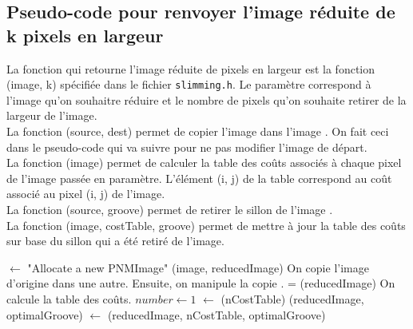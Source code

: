 \documentclass[a4paper, 11pt, oneside]{article}
\begin{document}
\subsection{Pseudo-code pour renvoyer l'image réduite de k pixels en largeur}
La fonction qui retourne l'image réduite de  pixels en largeur est la fonction (image, k) spécifiée dans le fichier \texttt{slimming.h}. Le paramètre  correspond à l'image qu'on souhaitre réduire et  le nombre de pixels qu'on souhaite retirer de la largeur de l'image.\\
La fonction (source, dest) permet de copier l'image  dans l'image . On fait ceci dans le pseudo-code qui va suivre pour ne pas modifier l'image de départ.\\
La fonction (image) permet de calculer la table des coûts associés à chaque pixel de l'image passée en paramètre. L'élément (i, j) de la table correspond au coût associé au pixel (i, j) de l'image.\\
La fonction (source, groove) permet de retirer le sillon  de l'image .\\
La fonction (image, costTable, groove) permet de mettre à jour la table des coûts  sur base du sillon  qui a été retiré de l'image.

\begin{codebox} %
        \li {} $\gets$ "Allocate a new PNMImage"
        \li {}(image, reducedImage)
        \li \hspace{0.4cm}\Comment On copie l'image d'origine dans une autre. Ensuite, on manipule la copie .
        \li {} = (reducedImage) \Comment On calcule la table des coûts.
        \li
	    \li \For $number \gets 1$ \To {}
                \Do
         \li    	{} $\gets$ (nCostTable)
         \li		{}(reducedImage, optimalGroove)
         \li		{} $\gets$ (reducedImage, nCostTable, optimalGroove)
                \End
        \li
        \li \Return {}
\end{codebox}
\end{document}
